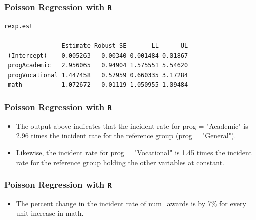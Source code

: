 \documentclass[00-GLMregslides.tex]{subfiles}
\begin{document}
\begin{frame}[fragile]

\frametitle{Poisson Regression with \texttt{R}}

\begin{framed}
\begin{verbatim}
rexp.est
 
                Estimate Robust SE       LL      UL
 (Intercept)    0.005263   0.00340 0.001484 0.01867
 progAcademic   2.956065   0.94904 1.575551 5.54620
 progVocational 1.447458   0.57959 0.660335 3.17284
 math           1.072672   0.01119 1.050955 1.09484
\end{verbatim}
\end{framed}
\end{frame}
\begin{frame}[fragile]

\frametitle{Poisson Regression with \texttt{R}}
\Large 
\begin{itemize}
\item The output above indicates that the incident rate for prog = "Academic" is 2.96 times the incident rate for the reference group (prog = "General"). 
\item Likewise, the incident rate for prog = "Vocational" is 1.45 times the incident rate for the reference group holding the other variables at constant. 

\end{itemize}

\end{frame}
\begin{frame}[fragile]

\frametitle{Poisson Regression with \texttt{R}}
\Large 
\begin{itemize}
\item
The percent change in the incident rate of num\_awards is by 7\% for every unit increase in math. 
\end{itemize}
\end{frame}
\end{document}
